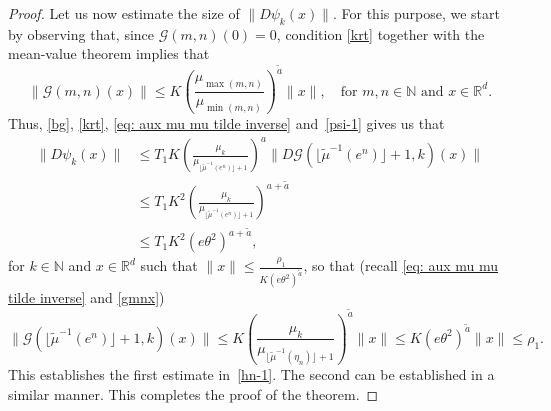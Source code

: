 \documentclass[reqno, a4paper, 10pt]{amsart}
\theoremstyle{plain}
\numberwithin{equation}{section}
\theoremstyle{remark}
\def\N{\mathbb{N}}
\def\R{\mathbb{R}}
\begin{document}
\begin{proof}
Let us now estimate the size of $\|D\psi_k(x)\|$. For this purpose, we start by observing that, since $\mathcal G(m, n)(0)=0$, condition \eqref{krt} together with the mean-value theorem implies that 
\begin{equation}\label{gmnx}
\|\mathcal G(m, n)(x)\| \le K\left (\frac{\mu_{\max (m,n)}}{\mu_{\min (m,n)}}\right )^{\tilde a}\|x\|, \quad \text{for $m,n\in \N$ and $x\in \mathbb R^d$.}
\end{equation}
Thus, \eqref{bg}, \eqref{krt}, \eqref{eq: aux mu mu tilde inverse} and~\eqref{psi-1} gives us that
\[
\begin{split}
\|D\psi_k(x)\| &\le T_1K\left (\frac{\mu_k}{\mu_{\lfloor \widetilde{\mu}^{-1}(e^n)\rfloor+1}}\right )^a  \|D\mathcal G(\lfloor \widetilde{\mu}^{-1}(e^n)\rfloor+1, k)(x)\| \\
&\le T_1K^2 \left (\frac{\mu_k}{\mu_{\lfloor \widetilde{\mu}^{-1}(e^n)\rfloor+1}}\right )^{a+\tilde a} \\
&\le T_1 K^2 (e\theta^2)^{a+\tilde a},
\end{split}
\]
for $k\in \N$ and $x\in \R^d$ such that $\|x\| \le \frac{\rho_1}{K(e\theta^2)^{\tilde a}}$, so that (recall \eqref{eq: aux mu mu tilde inverse} and \eqref{gmnx})
\[
\|\mathcal G(\lfloor \widetilde{\mu}^{-1}(e^n)\rfloor+1, k)(x)\| \le K \left (\frac{\mu_k}{\mu_{\lfloor \widetilde{\mu}^{-1}(\eta_n)\rfloor+1}}\right )^{\tilde a}\|x\| \le K(e\theta^2)^{\tilde a}\|x\| \le \rho_1.
\]
This establishes the first estimate in~\eqref{hn-1}. The second can be established in a similar manner. This completes the proof of the theorem.
\end{proof} 
\end{document}
